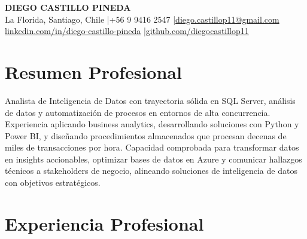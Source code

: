 \documentclass[11pt,letterpaper]{article}
\begin{document}
\begin{center}
{\fontsize{16}{19}\selectfont\textbf{\MakeUppercase{Diego Castillo Pineda}}}\\[4pt]
{\small La Florida, Santiago, Chile \quad|\quad +56 9 9416 2547 \quad|\quad \href{mailto:diego.castillop11@gmail.com}{diego.castillop11@gmail.com}\\
\href{https://linkedin.com/in/diego-castillo-pineda}{linkedin.com/in/diego-castillo-pineda} \quad|\quad \href{https://github.com/diegocastillop11}{github.com/diegocastillop11}}
\end{center}

\section{Resumen Profesional}
Analista de Inteligencia de Datos con trayectoria sólida en SQL Server, análisis de datos y automatización de procesos en entornos de alta concurrencia. Experiencia aplicando business analytics, desarrollando soluciones con Python y Power BI, y diseñando procedimientos almacenados que procesan decenas de miles de transacciones por hora. Capacidad comprobada para transformar datos en insights accionables, optimizar bases de datos en Azure y comunicar hallazgos técnicos a stakeholders de negocio, alineando soluciones de inteligencia de datos con objetivos estratégicos.

\section{Experiencia Profesional}
\end{document}
